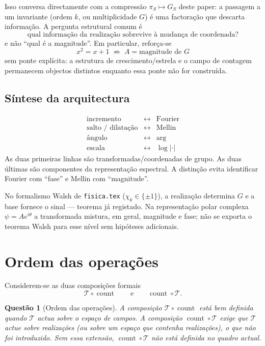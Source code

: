 \documentclass[11pt,a4paper]{article}
\newtheorem{questao}{Questão}
\begin{document}
Isso conversa directamente com a compressão \(\pi_S\mapsto G_S\) deste paper: a passagem a um invariante (ordem \(k\), ou multiplicidade \(G\)) é uma factoração que descarta informação. A pergunta estrutural comum é
\[
\boxed{\text{qual informação da realização sobrevive à mudança de coordenada?}}
\]
e não ``qual é a magnitude''. Em particular, reforça-se
\[
\boxed{x^2=x+1\;\not\Rightarrow\; A=\text{magnitude de }G}
\]
sem ponte explícita: a estrutura de crescimento/estrela e o campo de contagem permanecem objectos distintos enquanto essa ponte não for construída.

\subsection{Síntese da arquitectura}

\[
\boxed{
\begin{array}{ccc}
\text{incremento} &\longleftrightarrow& \text{Fourier}\\
\text{salto / dilatação} &\longleftrightarrow& \text{Mellin}\\
\text{ângulo} &\longleftrightarrow& \arg\\
\text{escala} &\longleftrightarrow& \log\lvert\cdot\rvert
\end{array}
}
\]
As duas primeiras linhas são transformadas/coordenadas de grupo. As duas últimas são componentes da representação espectral. A distinção evita identificar Fourier com ``fase'' e Mellin com ``magnitude''.

No formalismo Walsh de \texttt{fisica.tex} (\(\chi_k\in\{\pm1\}\)), a realização determina \(G\) e a base fornece o sinal --- teorema já registado. Na representação polar complexa \(\psi=A e^{i\theta}\) a transformada mistura, em geral, magnitude e fase; não se exporta o teorema Walsh para esse nível sem hipóteses adicionais.

\section{Ordem das operações}

Considerem-se as duas composições formais
\[
\mathcal T\circ\operatorname{count}
\qquad\text{e}\qquad
\operatorname{count}\circ\mathcal T.
\]

\begin{questao}[Ordem das operações]
\label{quest:ordem}
A composição \(\mathcal T\circ\operatorname{count}\) está bem definida quando \(\mathcal T\) actua sobre o espaço de campos. A composição \(\operatorname{count}\circ\mathcal T\) exige que \(\mathcal T\) actue sobre realizações (ou sobre um espaço que contenha realizações), o que não foi introduzido. Sem essa extensão, \(\operatorname{count}\circ\mathcal T\) não está definida no quadro actual.
\end{questao}
\end{document}
